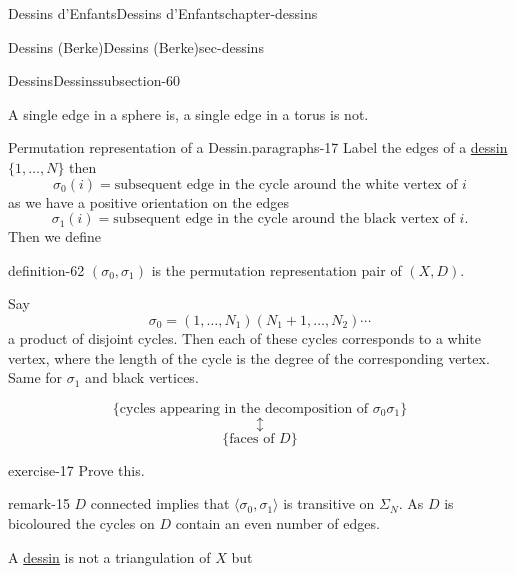 \documentclass[oneside,10pt,]{book}
\numberwithin{equation}{section}
\begin{document}
\begin{chapterptx}{Dessins d'Enfants}{}{Dessins d'Enfants}{}{}{chapter-dessins}
\begin{sectionptx}{Dessins (Berke)}{}{Dessins (Berke)}{}{}{sec-dessins}
\begin{subsectionptx}{Dessins}{}{Dessins}{}{}{subsection-60}
\par
\hypertarget{p-639}{}%
A single edge in a sphere is, a single edge in a torus is not.%
\begin{paragraphs}{Permutation representation of a Dessin.}{paragraphs-17}%
\hypertarget{p-640}{}%
Label the edges of  a \hyperref[def-dessin-denfant]{dessin} \(\{1, \ldots, N\}\) then%
\begin{equation*}
\sigma_0(i) = \text{subsequent edge in the cycle around the white vertex of }i
\end{equation*}
as we have a positive orientation on the edges%
\begin{equation*}
\sigma_1(i) = \text{subsequent edge in the cycle around the black vertex of }i\text{.}
\end{equation*}
Then we define%
\begin{definition}{}{definition-62}%
\hypertarget{p-641}{}%
\((\sigma_0, \sigma_1)\) is the permutation representation pair of \((X,D)\).%
\end{definition}
\hypertarget{p-642}{}%
Say%
\begin{equation*}
\sigma_0 = (1 , \ldots, N_1) (N_1 + 1 , \ldots, N_2)\cdots
\end{equation*}
a product of disjoint cycles. Then each of these cycles corresponds to a  white vertex, where the length of the cycle is the degree of the corresponding vertex. Same for \(\sigma_1\) and black vertices.%
\par
\hypertarget{p-643}{}%
%
\begin{equation*}
\{\text{cycles appearing in the decomposition of }\sigma_0\sigma_1\}
\end{equation*}
%
\begin{equation*}
\updownarrow
\end{equation*}
%
\begin{equation*}
\{\text{faces of }D\}
\end{equation*}
%
\begin{inlineexercise}{}{exercise-17}%
\hypertarget{p-644}{}%
Prove this.%
\end{inlineexercise}
\begin{remark}{}{remark-15}%
\hypertarget{p-645}{}%
\(D\) connected implies that \(\langle \sigma_0, \sigma_1 \rangle\) is transitive on \(\Sigma_N\). As \(D\) is bicoloured the cycles on \(D\) contain an even number of edges.%
\end{remark}
\hypertarget{p-646}{}%
A \hyperref[def-dessin-denfant]{dessin} is not a triangulation of \(X\) but%
\begin{equation*}

\end{equation*}
\end{paragraphs}
\end{subsectionptx}
\end{sectionptx}
\end{chapterptx}
\end{document}
